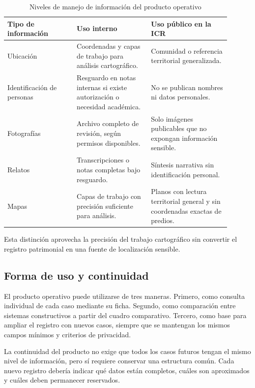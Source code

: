 \begin{table}[ht]
	\centering
	\caption{Niveles de manejo de información del producto operativo}
	\vspace{0.25cm}
	\label{tab:niveles_privacidad_producto}
	\begin{tabular}{@{}L{0.28\linewidth}L{0.30\linewidth}L{0.32\linewidth}@{}}
		\toprule
		\textbf{Tipo de información} & \textbf{Uso interno} & \textbf{Uso público en la ICR} \\
		\midrule
		Ubicación & Coordenadas y capas de trabajo para análisis cartográfico. & Comunidad o referencia territorial generalizada. \\
		Identificación de personas & Resguardo en notas internas si existe autorización o necesidad académica. & No se publican nombres ni datos personales. \\
		Fotografías & Archivo completo de revisión, según permisos disponibles. & Solo imágenes publicables que no expongan información sensible. \\
		Relatos & Transcripciones o notas completas bajo resguardo. & Síntesis narrativa sin identificación personal. \\
		Mapas & Capas de trabajo con precisión suficiente para análisis. & Planos con lectura territorial general y sin coordenadas exactas de predios. \\
		\bottomrule
	\end{tabular}
\end{table}

Esta distinción aprovecha la precisión del trabajo cartográfico sin convertir el registro patrimonial en una fuente de localización sensible.

\subsection{Forma de uso y continuidad}

El producto operativo puede utilizarse de tres maneras. Primero, como consulta individual de cada caso mediante su ficha. Segundo, como comparación entre sistemas constructivos a partir del cuadro comparativo. Tercero, como base para ampliar el registro con nuevos casos, siempre que se mantengan los mismos campos mínimos y criterios de privacidad.

La continuidad del producto no exige que todos los casos futuros tengan el mismo nivel de información, pero sí requiere conservar una estructura común. Cada nuevo registro debería indicar qué datos están completos, cuáles son aproximados y cuáles deben permanecer reservados.
